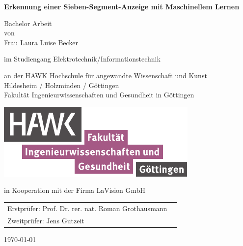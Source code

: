 

\begin{titlepage}
	\begin{center}
		{\Large \textbf{Erkennung einer Sieben-Segment-Anzeige mit Maschinellem Lernen}}
		
		\vspace{\fill}
		
		Bachelor Arbeit \\
		von \\
		Frau Laura Luise Becker
		
		\vspace{0.9cm}
		
		im Studiengang Elektrotechnik/Informationstechnik \\
		
		
		\vspace{0.9cm}
		
		an der HAWK Hochschule für angewandte Wissenschaft und Kunst\\
		Hildesheim / Holzminden / Göttingen\\
		Fakultät Ingenieurwissenschaften und Gesundheit in Göttingen
		
		\vspace{0.1cm}
		
		\includegraphics[scale=1.5]{pic/hawk}
		
		\vspace{0.1cm}
		
		in Kooperation mit der Firma LaVision GmbH\\
		
		
		\vspace{2.0cm}
		
		\begin{tabular}{p{10cm}l}
			Erstprüfer:  Prof. Dr. rer. nat. Roman Grothausmann \\ 
			Zweitprüfer: Jens Gutzeit\\
		\end{tabular} 
		
		\vspace{1.6cm}
	
		\today
		
	\end{center}
	
	
	
\end{titlepage}